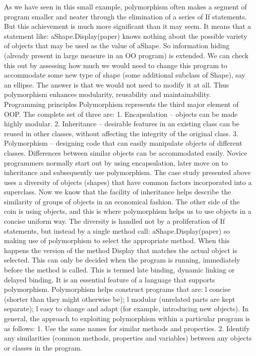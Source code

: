 As we have seen in this small example, polymorphism often makes a segment of 
program smaller and neater through the elimination of a series of If statements. But this achievement is much more signiﬁcant than it may seem. It means that a statement like:
aShape.Display(paper)
knows nothing about the possible variety of objects that may be used as the value of aShape. So information hiding (already present in large measure in an OO program) is extended. We can check this out by assessing how much we would need to change this program to accommodate some new type of shape (some additional subclass of Shape), say an ellipse. The answer is that we would not need to modify it at all. Thus polymorphism enhances modularity, reusability and maintainability.
Programming principles
Polymorphism represents the third major element of OOP. The complete set of three are:
1.	Encapsulation – objects can be made highly modular.
2.	Inheritance – desirable features in an existing class can be reused in other classes, without affecting the integrity of the original class.
3.	Polymorphism – designing code that can easily manipulate objects of different classes. Differences between similar objects can be accommodated easily.
Novice programmers normally start out by using encapsulation, later move on to inheritance and subsequently use polymorphism.
The case study presented above uses a diversity of objects (shapes) that have common factors incorporated into a superclass. Now we know that the facility of inheritance helps describe the similarity of groups of objects in an economical fashion. The other side of the coin is using objects, and this is where polymorphism helps us to use objects in a concise uniform way. The diversity is handled not by a proliferation of If statements, but instead by a single method call:
aShape.Display(paper)
so making use of polymorphism to select the appropriate method. When this happens the version of the method Display that matches the actual object is selected. This can only be decided when the program is running, immediately before the method is called. This is termed late binding, dynamic linking or delayed binding. It is an essential feature of a language that supports polymorphism.
Polymorphism helps construct programs that are:
l	concise (shorter than they might otherwise be);
l	modular (unrelated parts are kept separate);
l	easy to change and adapt (for example, introducing new objects).
In general, the approach to exploiting polymorphism within a particular program is as follows:
1.	Use the same names for similar methods and properties.
2.	Identify any similarities (common methods, properties and variables) between any objects or classes in the program.
